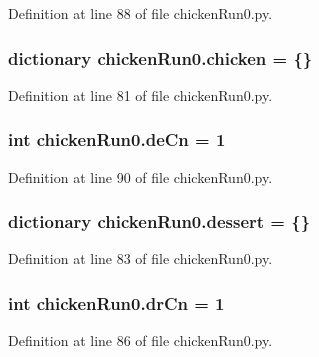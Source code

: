 Definition at line 88 of file chicken\-Run0.\-py.

\hypertarget{namespacechickenRun0_aa82cb1076988299bd35184a083665f86}{
\subsubsection[{chicken}]{\setlength{\rightskip}{0pt plus 5cm}dictionary chicken\-Run0.\-chicken = \{\}}}\label{namespacechickenRun0_aa82cb1076988299bd35184a083665f86}


Definition at line 81 of file chicken\-Run0.\-py.

\hypertarget{namespacechickenRun0_a19f198e118a08e3267d9e38351d9d744}{
\subsubsection[{de\-Cn}]{\setlength{\rightskip}{0pt plus 5cm}int chicken\-Run0.\-de\-Cn = 1}}\label{namespacechickenRun0_a19f198e118a08e3267d9e38351d9d744}


Definition at line 90 of file chicken\-Run0.\-py.

\hypertarget{namespacechickenRun0_a92135454144f5798969cf77ac76af7a9}{
\subsubsection[{dessert}]{\setlength{\rightskip}{0pt plus 5cm}dictionary chicken\-Run0.\-dessert = \{\}}}\label{namespacechickenRun0_a92135454144f5798969cf77ac76af7a9}


Definition at line 83 of file chicken\-Run0.\-py.

\hypertarget{namespacechickenRun0_ad0fb72b77ed7ae37cc3d23edd05cd697}{
\subsubsection[{dr\-Cn}]{\setlength{\rightskip}{0pt plus 5cm}int chicken\-Run0.\-dr\-Cn = 1}}\label{namespacechickenRun0_ad0fb72b77ed7ae37cc3d23edd05cd697}


Definition at line 86 of file chicken\-Run0.\-py.

